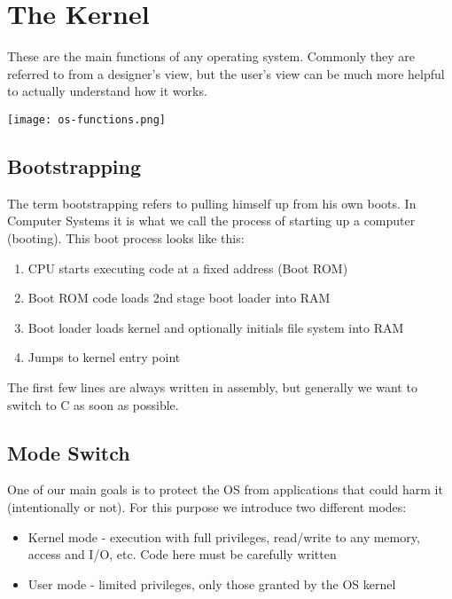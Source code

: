 \section{The Kernel}

These are the main functions of any operating system. Commonly they are referred to from a designer's view, but the user's view can be much more helpful to actually understand how it works.

\begin{center}
	\texttt{[image: os-functions.png]}
\end{center}


\subsection{Bootstrapping}

The term bootstrapping refers to pulling himself up from his own boots. In Computer Systems it is what we call the process of starting up a computer (booting). This boot process looks like this:

\begin{enumerate}
	\item CPU starts executing code at a fixed address (Boot ROM)
	\item Boot ROM code loads 2nd stage boot loader into RAM
	\item Boot loader loads kernel and optionally initials file system into RAM
	\item Jumps to kernel entry point
\end{enumerate}

The first few lines are always written in assembly, but generally we want to switch to C as soon as possible.


\subsection{Mode Switch}

One of our main goals is to protect the OS from applications that could harm it (intentionally or not). For this purpose we introduce two different modes:

\begin{itemize}
	\item Kernel mode - execution with full privileges, read/write to any memory, access and I/O, etc. Code here must be carefully written
	\item User mode - limited privileges, only those granted by the OS kernel
\end{itemize}

